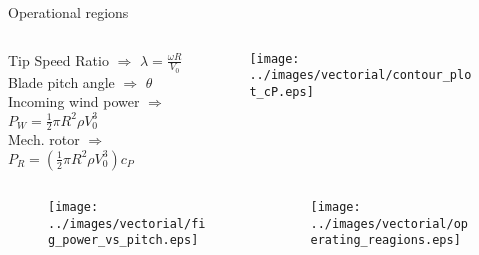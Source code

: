 \begin{frame}{Operational regions}

  \begin{columns}

    \begin{column}{0.5\columnwidth}
      Tip Speed Ratio $\Rightarrow$ $\lambda=\frac{\omega R}{V_0}$\\
      Blade pitch angle $\Rightarrow$ $\theta$\\
      Incoming wind power $\Rightarrow$ $P_W = \frac{1}{2}\pi R^2 \rho V_0^3$\\
      Mech. rotor $\Rightarrow$ $P_R = \left(\frac{1}{2}\pi R^2 \rho V_0^3\right) c_{P}$
    \end{column}

    \begin{column}{0.5\columnwidth}
      \begin{figure}
        \centering
        \texttt{[image: ../images/vectorial/contour\_plot\_cP.eps]}
      \end{figure}
    \end{column}
    
  \end{columns}

\begin{columns}
  \begin{column}{0.5\columnwidth}
    \begin{figure}
      \centering
      \texttt{[image: ../images/vectorial/fig\_power\_vs\_pitch.eps]}
    \end{figure}
  \end{column}
  \begin{column}{0.5\columnwidth}
    \begin{figure}[H]
      \centering
      \texttt{[image: ../images/vectorial/operating\_reagions.eps]}
    \end{figure}
  \end{column}
\end{columns}


\end{frame}
